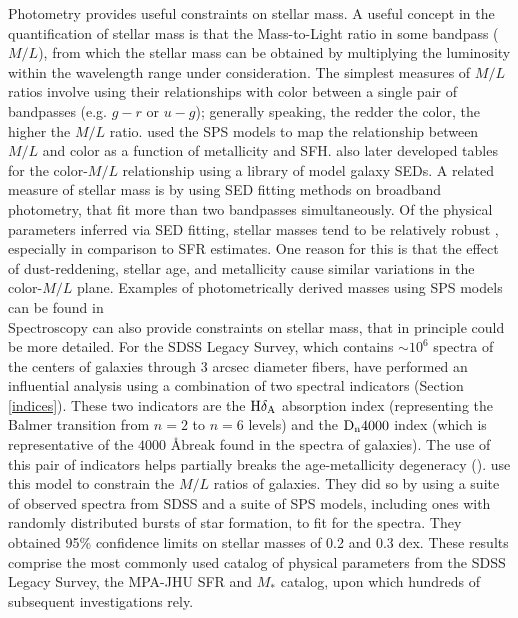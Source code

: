 Photometry provides useful constraints on stellar mass.  A useful
concept in the quantification of stellar mass is that the
Mass-to-Light ratio in some bandpass ($M/L$), from which the stellar
mass can be obtained by multiplying the luminosity within the
wavelength range under consideration.  The simplest measures of $M/L$
ratios involve using their relationships with color between a single
pair of bandpasses (e.g. $g-r$ or $u-g$); generally speaking, the
redder the color, the higher the $M/L$
ratio. \citet{2001ApJ...550..212B} used the
\citet{bruzual_stellar_2003} SPS models to map the relationship
between $M/L$ and color as a function of metallicity and
SFH. \citep{2009MNRAS.400.1181Z} also later developed tables for the
color-$M/L$ relationship using a library of model galaxy SEDs.  A
related measure of stellar mass is by using SED fitting methods on
broadband photometry, that fit more than two bandpasses
simultaneously. Of the physical parameters inferred via SED fitting,
stellar masses tend to be relatively robust
\citep{2001ApJ...559..620P, 2009ApJ...701.1839M}, especially in
comparison to SFR estimates. One reason for this is that the effect of
dust-reddening, stellar age, and metallicity cause similar variations
in the color-$M/L$ plane.  Examples of photometrically derived masses
using SPS models can be found in \citet{2004ApJ...616L.103D,
  2007AJ....133..734B}\\

Spectroscopy can also provide constraints on stellar mass, that in
principle could be more detailed. For the SDSS Legacy Survey, which
contains $\sim 10^6$ spectra of the centers of galaxies through 3
arcsec diameter fibers, \citet{kauffmann_stellar_2003} have performed
an influential analysis using a combination of two spectral indicators
(Section \ref{indices}). These two indicators are the ${\rm
  H}\delta_{\rm A}$ absorption index (representing the Balmer
transition from $n = 2$ to $n = 6$ levels) and the ${\rm D}_{\rm n}
4000$ index (which is representative of the $4000$ \AA break found in
the spectra of galaxies).  The use of this pair of indicators helps
partially breaks the age-metallicity degeneracy
(\citealt{worthey_comprehensive_1994}). \citet{kauffmann_stellar_2003}
use this model to constrain the $M/L$ ratios of galaxies. They did so
by using a suite of observed spectra from SDSS and a suite of SPS
models, including ones with randomly distributed bursts of star
formation, to fit for the spectra. They obtained 95\% confidence
limits on stellar masses of 0.2 and 0.3 dex.  These results comprise
the most commonly used catalog of physical parameters from the SDSS
Legacy Survey, the MPA-JHU SFR and $M_{*}$ catalog, upon which
hundreds of subsequent investigations rely.

